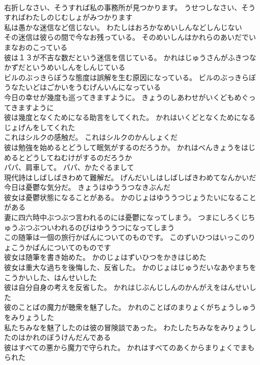 \documentclass[8pt]{extreport}
\begin{document}
\begin{CJK}{UTF8}{min}
\\	右折しなさい、そうすれば私の事務所が見つかります。	うせつしなさい、そうすればわたしのじむしょがみつかります 
\\	私は愚かな迷信など信じない。	わたしはおろかなめいしんなどしんじない 
\\	その迷信は彼らの間で今なお残っている。	そのめいしんはかれらのあいだでいまなおのこっている 
\\	彼は１３が不吉な数だという迷信を信じている。	かれはじゅうさんがふきつなかずだというめいしんをしんじている 
\\	ビルのぶっきらぼうな態度は誤解を生む原因になっている。	ビルのぶっきらぼうなたいどはごかいをうむげんいんになっている 
\\	今日の幸せが幾度も巡ってきますように。	きょうのしあわせがいくどもめぐってきますように 
\\	彼は幾度となくためになる助言をしてくれた。	かれはいくどとなくためになるじょげんをしてくれた 
\\	これはシルクの感触だ。	これはシルクのかんしょくだ 
\\	彼は勉強を始めるとどうして眠気がするのだろうか。	かれはべんきょうをはじめるとどうしてねむけがするのだろうか 
\\	パパ、肩車して。	パパ、かたぐるまして 
\\	現代詩はしばしばきわめて難解だ。	げんだいしはしばしばきわめてなんかいだ 
\\	今日は憂鬱な気分だ。	きょうはゆううつなきぶんだ 
\\	彼女は憂鬱状態になることがある。	かのじょはゆううつじょうたいになることがある 
\\	妻に四六時中ぶつぶつ言われるのには憂鬱になってしまう。	つまにしろくじちゅうぶつぶついわれるのびはゆううつになってしまう 
\\	この随筆は一個の旅行かばんについてのものです。	このずいひつはいっこのりょこうかばんについてのものです 
\\	彼女は随筆を書き始めた。	かのじょはずいひつをかきはじめた 
\\	彼女は重大な過ちを後悔した、反省した。	かのじょはじゅうだいなあやまちをこうかいした、はんせいした 
\\	彼は自分自身の考えを反省した。	かれはじぶんじしんのかんがえをはんせいした 
\\	彼のことばの魔力が聴衆を魅了した。	かれのことばのまりょくがちょうしゅうをみりょうした 
\\	私たちみなを魅了したのは彼の冒険談であった。	わたしたちみなをみりょうしたのはかれのぼうけんだんである 
\\	彼はすべての悪から魔力で守られた。	かれはすべてのあくからまりょくでまもられた 

\end{CJK}
\end{document}
